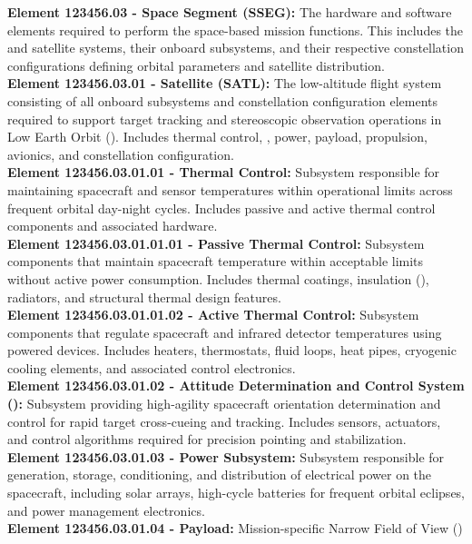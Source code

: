 \textbf{Element 123456.03 - Space Segment (SSEG):} The hardware and software elements
required to perform the space-based mission functions. This includes the  and
 satellite systems, their onboard subsystems, and their respective constellation
configurations defining orbital parameters and satellite distribution.\\
\textbf{Element 123456.03.01 - Satellite  (SATL):} The low-altitude flight system
consisting of all onboard subsystems and constellation configuration elements required to
support target tracking and stereoscopic observation operations in Low Earth Orbit ().
Includes thermal control, , power, payload, propulsion, avionics, and 
constellation configuration.\\
\textbf{Element 123456.03.01.01 - Thermal Control:} Subsystem responsible for maintaining
 spacecraft and sensor temperatures within operational limits across frequent
orbital day-night cycles. Includes passive and active thermal control components and
associated hardware.\\
\textbf{Element 123456.03.01.01.01 - Passive Thermal Control:} Subsystem components
that maintain  spacecraft temperature within acceptable limits without active power
consumption. Includes thermal coatings, insulation (), radiators, and structural
thermal design features.\\
\textbf{Element 123456.03.01.01.02 - Active Thermal Control:} Subsystem components that
regulate  spacecraft and infrared detector temperatures using powered devices.
Includes heaters, thermostats, fluid loops, heat pipes, cryogenic cooling elements, and
associated control electronics.\\
\textbf{Element 123456.03.01.02 - Attitude Determination and Control System ():}
Subsystem providing high-agility  spacecraft orientation determination and control
for rapid target cross-cueing and tracking. Includes sensors, actuators, and control
algorithms required for precision pointing and stabilization.\\
\textbf{Element 123456.03.01.03 - Power Subsystem:} Subsystem responsible for
generation, storage, conditioning, and distribution of electrical power on the 
spacecraft, including solar arrays, high-cycle batteries for frequent orbital eclipses, and
power management electronics.\\
\textbf{Element 123456.03.01.04 - Payload:} Mission-specific Narrow Field of View ()
